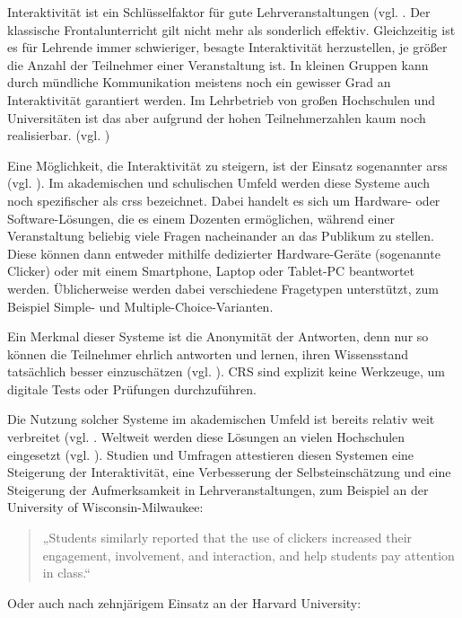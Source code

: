 Interaktivität ist ein Schlüsselfaktor für gute Lehrveranstaltungen (vgl. \cite[S. 1]{art:ieee}. Der klassische Frontalunterricht gilt nicht mehr als sonderlich effektiv. Gleichzeitig ist es für Lehrende immer schwieriger, besagte Interaktivität herzustellen, je größer die Anzahl der Teilnehmer einer Veranstaltung ist. In kleinen Gruppen kann durch mündliche Kommunikation meistens noch ein gewisser Grad an Interaktivität garantiert werden. Im Lehrbetrieb von großen Hochschulen und Universitäten ist das aber aufgrund der hohen Teilnehmerzahlen kaum noch realisierbar. (vgl. \cite[S. 389]{art:crs_informatik_spektrum})


Eine Möglichkeit, die Interaktivität zu steigern, ist der Einsatz sogenannter \acp{ars} (vgl. \cite[S. 5]{art:ieee}). Im akademischen und schulischen Umfeld werden diese Systeme auch noch spezifischer als \acp{crs} bezeichnet. Dabei handelt es sich um Hardware- oder Software-Lösungen, die es einem Dozenten ermöglichen, während einer Veranstaltung beliebig viele Fragen nacheinander an das Publikum zu stellen. Diese können dann entweder mithilfe dedizierter Hardware-Geräte (sogenannte Clicker) oder mit einem Smartphone, Laptop oder Tablet-PC beantwortet werden. Üblicherweise werden dabei verschiedene Fragetypen unterstützt, zum Beispiel Simple- und Multiple-Choice-Varianten.

Ein Merkmal dieser Systeme ist die Anonymität der Antworten, denn nur so können die Teilnehmer ehrlich antworten und lernen, ihren Wissensstand tatsächlich besser einzuschätzen (vgl. \cite[S. 106]{art:crs_literature_review}). CRS sind explizit keine Werkzeuge, um digitale Tests oder Prüfungen durchzuführen.

Die Nutzung solcher Systeme im akademischen Umfeld ist bereits relativ weit verbreitet (vgl. \cite[S. 392]{art:crs_informatik_spektrum}. Weltweit werden diese Lösungen an vielen Hochschulen eingesetzt (vgl. \cite{web:elanwiki}). Studien und Umfragen attestieren diesen Systemen eine Steigerung der Interaktivität, eine Verbesserung der Selbsteinschätzung und eine Steigerung der Aufmerksamkeit in Lehrveranstaltungen, zum Beispiel an der University of Wisconsin-Milwaukee\cite[S. 5]{paper:wisconsin_clicker}:

\begin{quote}
„Students similarly reported that the use of clickers increased their engagement, involvement, and interaction, and help students pay attention in class.“
\end{quote}

Oder auch nach zehnjärigem Einsatz an der Harvard University\cite[S. 6]{paper:harvard_tenyears}:

